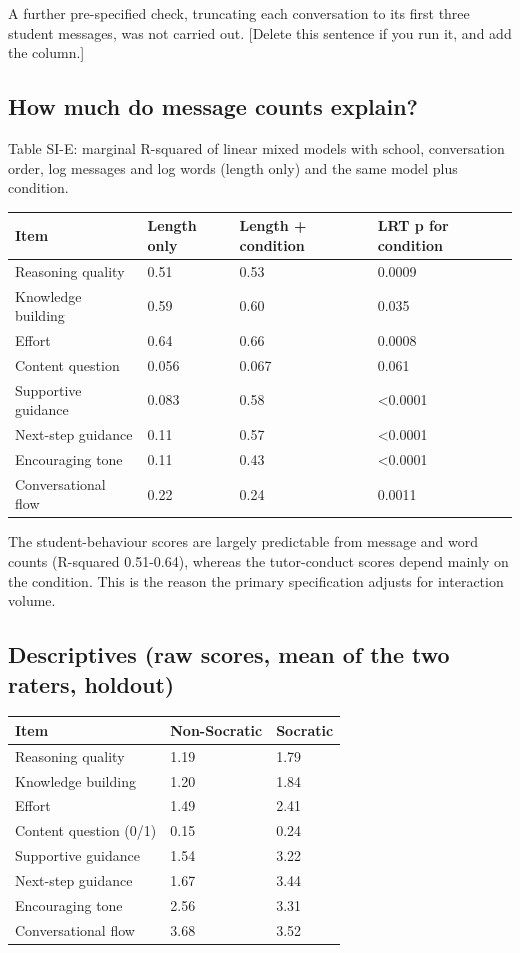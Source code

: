 \documentclass[
  12pt,
]{article}
\begin{document}
A further pre-specified check, truncating each conversation to its first three student messages, was not carried out. {[}Delete this sentence if you run it, and add the column.{]}

\subsection{How much do message counts explain?}\label{how-much-do-message-counts-explain}

Table SI-E: marginal R-squared of linear mixed models with school, conversation order, log messages and log words (length only) and the same model plus condition.

\begin{longtable}[]{@{}llll@{}}
\toprule\noalign{}
Item & Length only & Length + condition & LRT p for condition \\
\midrule\noalign{}
\endhead
\bottomrule\noalign{}
\endlastfoot
Reasoning quality & 0.51 & 0.53 & 0.0009 \\
Knowledge building & 0.59 & 0.60 & 0.035 \\
Effort & 0.64 & 0.66 & 0.0008 \\
Content question & 0.056 & 0.067 & 0.061 \\
Supportive guidance & 0.083 & 0.58 & \textless0.0001 \\
Next-step guidance & 0.11 & 0.57 & \textless0.0001 \\
Encouraging tone & 0.11 & 0.43 & \textless0.0001 \\
Conversational flow & 0.22 & 0.24 & 0.0011 \\
\end{longtable}

The student-behaviour scores are largely predictable from message and word counts (R-squared 0.51-0.64), whereas the tutor-conduct scores depend mainly on the condition. This is the reason the primary specification adjusts for interaction volume.

\subsection{Descriptives (raw scores, mean of the two raters, holdout)}\label{descriptives-raw-scores-mean-of-the-two-raters-holdout}

\begin{longtable}[]{@{}lll@{}}
\toprule\noalign{}
Item & Non-Socratic & Socratic \\
\midrule\noalign{}
\endhead
\bottomrule\noalign{}
\endlastfoot
Reasoning quality & 1.19 & 1.79 \\
Knowledge building & 1.20 & 1.84 \\
Effort & 1.49 & 2.41 \\
Content question (0/1) & 0.15 & 0.24 \\
Supportive guidance & 1.54 & 3.22 \\
Next-step guidance & 1.67 & 3.44 \\
Encouraging tone & 2.56 & 3.31 \\
Conversational flow & 3.68 & 3.52 \\
\end{longtable}
\end{document}
